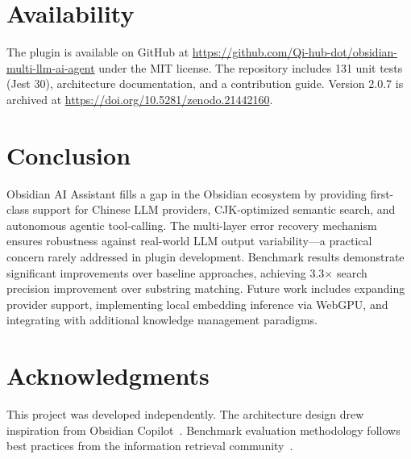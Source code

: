 \documentclass[10pt,a4paper]{article}
\begin{document}
\section{Availability}

The plugin is available on GitHub at \url{https://github.com/Qi-hub-dot/obsidian-multi-llm-ai-agent} under the MIT license. The repository includes 131 unit tests (Jest 30), architecture documentation, and a contribution guide. Version 2.0.7 is archived at \url{https://doi.org/10.5281/zenodo.21442160}.

\section{Conclusion}

Obsidian AI Assistant fills a gap in the Obsidian ecosystem by providing first-class support for Chinese LLM providers, CJK-optimized semantic search, and autonomous agentic tool-calling. The multi-layer error recovery mechanism ensures robustness against real-world LLM output variability---a practical concern rarely addressed in plugin development. Benchmark results demonstrate significant improvements over baseline approaches, achieving 3.3$\times$ search precision improvement over substring matching. Future work includes expanding provider support, implementing local embedding inference via WebGPU, and integrating with additional knowledge management paradigms.

\section{Acknowledgments}

This project was developed independently. The architecture design drew inspiration from Obsidian Copilot~\cite{obsidian_copilot}. Benchmark evaluation methodology follows best practices from the information retrieval community~\cite{joss}.



\end{document}

